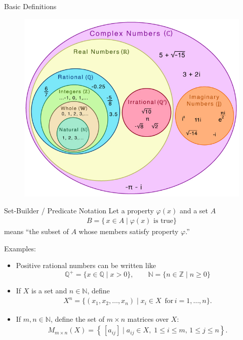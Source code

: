 \documentclass[11pt,aspectratio=43,ignorenonframetext,t]{beamer}
\begin{document}
\begin{frame}{Basic Definitions}
\begin{figure}
    \centering
    \includegraphics[width=0.7\linewidth]{Number-Sets-Venn-Diagram.png}
\end{figure}

\end{frame}

\begin{frame}{Set-Builder / Predicate Notation}
Let a property $\varphi(x)$ and a set $A$
\begin{align*}
  B = \{\, x \in A \mid \varphi(x) \text{ is true} \}
\end{align*}
means “the subset of \(A\) whose members satisfy property \(\varphi\).”


\begin{block}{Examples:}
\vspace{-0.2cm}

\begin{itemize}
    \item Positive rational numbers can be written like
    $$\mathbb{Q}^{+} = \{ x \in \mathbb{Q} \mid x > 0\}, \qquad
  \mathbb{N} = \{ n \in \mathbb{Z} \mid n \ge 0 \}$$
\item If \(X\) is a set and \(n \in \mathbb{N}\), define
\begin{align*}
  X^n = \{ (x_1, x_2, \dots, x_n) \mid x_i \in X \, \, \,\text{for}\, i = 1,\dots,n\}.
\end{align*}
\item If \(m,n \in \mathbb{N}\), define the set of \(m\times n\) matrices over \(X\):
\begin{align*}
  M_{m \times n}(X) = \left\{\, [a_{ij}] \mid a_{ij} \in X,\; 1 \le i \le m,\,1 \le j \le n\right\}.
\end{align*}
\end{itemize}
   
\end{block}
\end{frame}
\end{document}
